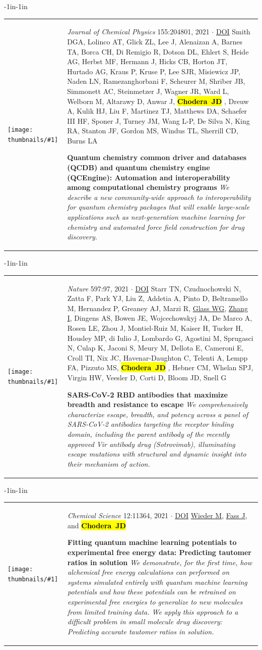 \documentclass[10pt]{article}
\newcommand{\newarticle}[7]{
\begin{adjustwidth}{-1in}{-1in}  
\begin{tabular}{p{0.9in}p{7in}}
\parbox[c]{0.9in}{\texttt{[image: thumbnails/\#1]}} & \parbox[c]{6in}{\setstretch{0.9} {\small #4} $\cdot$ \href{#6}{#5} \\ {\footnotesize {#2}} \\ \raggedright { \bf\nohyphens{#3}}  \\ {\footnotesize\emph {#7}}} %
\end{tabular}
\end{adjustwidth}
\vspace{0.2in}
}
\newcommand{\jdc}{ {\bf \hl{Chodera~JD}} } %
\begin{document}
\newarticle{qcarchive}{Smith DGA, Lolinco AT, Glick ZL, Lee J, Alenaizan A, Barnes TA, Borca CH, Di Remigio R, Dotson DL, Ehlert S, Heide AG, Herbst MF, Hermann J, Hicks CB, Horton JT, Hurtado AG, Kraus P, Kruse P, Lee SJR, Misiewicz JP, Naden LN, Ramezanghorbani F, Scheurer M, Shriber JB, Simmonett AC, Steinmetzer J, Wagner JR, Ward L, Welborn M, Altarawy D, Anwar J, \jdc, Dreuw A, Kulik HJ, Liu F, Martinez TJ, Matthews DA, Schaefer III HF, Sponer J, Turney JM, Wang L-P, De Silva N, King RA, Stanton JF, Gordon MS, Windus TL, Sherrill CD, Burns LA}{Quantum chemistry common driver and databases (QCDB) and quantum chemistry engine (QCEngine): Automation and interoperability among computational chemistry programs}{\emph{Journal of Chemical Physics} 155:204801, 2021}{DOI}{https://doi.org/10.1063/5.0059356}{We describe a new community-wide approach to interoperability for quantum chemistry packages that will enable large-scale applications such as next-generation machine learning for chemistry and automated force field construction for drug discovery.}

\newarticle{vir-antibodies-escape}{Starr TN, Czudnochowski N, Zatta F, Park YJ, Liu Z, Addetia A, Pinto D, Beltramello M, Hernandez P, Greaney AJ, Marzi R, \underline{Glass WG}, \underline{Zhang I}, Dingens AS, Bowen JE, Wojcechowskyj JA, De Marco A, Rosen LE, Zhou J, Montiel-Ruiz M, Kaiser H, Tucker H, Housley MP, di Iulio J, Lombardo G, Agostini M, Sprugasci N, Culap K, Jaconi S, Meury M, Dellota E, Cameroni E, Croll TI, Nix JC, Havenar-Daughton C, Telenti A, Lempp FA, Pizzuto MS, \jdc, Hebner CM, Whelan SPJ, Virgin HW, Veesler D, Corti D, Bloom JD, Snell G}{SARS-CoV-2 RBD antibodies that maximize breadth and resistance to escape}{\emph{Nature} 597:97, 2021}{DOI}{https://doi.org/10.1038/s41586-021-03807-6}{We comprehensively characterize escape, breadth, and potency across a panel of SARS-CoV-2 antibodies targeting the receptor binding domain, including the parent antibody of the recently approved Vir antibody drug (Sotrovimab), illuminating escape mutations with structural and dynamic insight into their mechanism of action.}

\newarticle{neutromeratio-vacuum}{\underline{Wieder M}, \underline{Fass J}, and \jdc}{Fitting quantum machine learning potentials to experimental free energy data: Predicting tautomer ratios in solution}{\emph{Chemical Science} 12:11364, 2021}{DOI}{http://doi.org/10.1039/D1SC01185E}{We demonstrate, for the first time, how alchemical free energy calculations can performed on systems simulated entirely with quantum machine learning potentials and how these potentials can be retrained on experimental free energies to generalize to new molecules from limited training data. We apply this approach to a difficult problem in small molecule drug discovery: Predicting accurate tautomer ratios in solution.}
\end{document}
